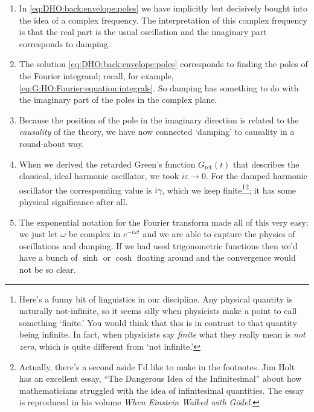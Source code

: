  \begin{enumerate}
 \item In \eqref{eq:DHO:back:envelope:poles} we have implicitly but decisively bought into the idea of a complex frequency. The interpretation of this complex frequency is that the real part is the usual oscillation and the imaginary part corresponds to damping.

 \item The solution \eqref{eq:DHO:back:envelope:poles} corresponds to finding the poles of the Fourier integrand; recall, for example, \eqref{eq:G:HO:Fourier:equation:integrals}. So damping has something to do with the imaginary part of the poles in the complex plane.

 \item Because the position of the pole in the imaginary direction is related to the \emph{causality} of the theory, we have now connected `damping' to causality in a round-about way.

 \item When we derived the retarded Green's function $G_\text{ret}(t)$ that describes the classical, ideal harmonic oscillator, we took $i\varepsilon\to 0$. For the damped harmonic oscillator the corresponding value is $i\gamma$, which we keep finite\footnote{Here's a funny bit of linguistics in our discipline. Any physical quantity is naturally not-infinite, so it seems silly when physicists make a point to call something `finite.' You would think that this is in contrast to that quantity being infinite. In fact, when physicists say \emph{finite} what they really mean is \emph{not zero}, which is quite different from `not infinite.'}\footnote{Actually, there's a second aside I'd like to make in the footnotes. Jim Holt has an excellent essay, ``The Dangerous Idea of the Infinitesimal'' about how mathematicians struggled with the idea of infinitesimal quantities. The essay is reproduced in his volume \emph{When Einstein Walked with G\"odel}.}; it has some physical significance after all.

 \item The exponential notation for the Fourier transform made all of this very easy: we just let $\omega$ be complex in $e^{-i\omega t}$ and we are able to capture the physics of oscillations and damping. If we had used trigonometric functions then we'd have a bunch of $\sinh$ or $\cosh$ floating around and the convergence would not be so clear.
 \end{enumerate}
 
